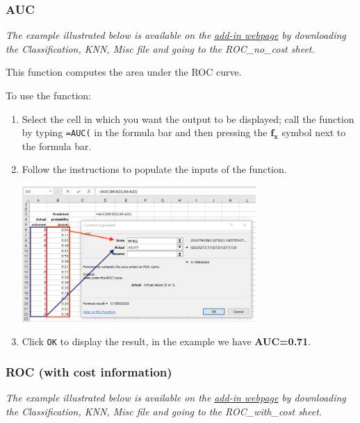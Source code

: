\documentclass[12pt]{article}
\begin{document}
\subsubsection{AUC}

\textit{The example illustrated below is available on the}  \href{https://www8.gsb.columbia.edu/bizanalytics/excel-add-in/multiplatform#h-4}{ \textit{add-in webpage}}
 \textit{by downloading the Classification, KNN, Misc file and going to the ROC\_no\_cost sheet.}
 
This function computes the area under the ROC curve.

To use the function:
\begin{enumerate}
\item Select the cell in which you want the output to be displayed; call the function by typing \texttt{=AUC(} in the formula bar and then pressing the $\boldsymbol{f_x}$ symbol next to the formula bar.

\item Follow the instructions to populate the inputs of the function.

\medskip

\centerline{\includegraphics[width=3.5in]{figures/auc.png}}

\medskip

\item Click \texttt{OK} to display the result, in the example we have \textbf{AUC=0.71}.

\end{enumerate}

\subsubsection{ROC (with cost information)}\label{ROCcost}

\textit{The example illustrated below is available on the}  \href{https://www8.gsb.columbia.edu/bizanalytics/excel-add-in/multiplatform#h-4}{ \textit{add-in webpage}}
 \textit{by downloading the Classification, KNN, Misc file and going to the ROC\_with\_cost sheet.}
 
\end{document}
